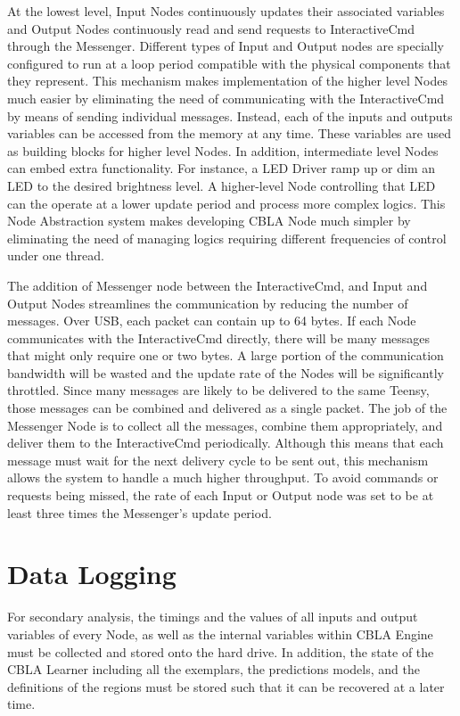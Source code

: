 At the lowest level, Input Nodes continuously updates their associated variables and Output Nodes continuously read and send requests to InteractiveCmd through the Messenger. Different types of Input and Output nodes are specially configured to run at a loop period compatible with the physical components that they represent. This mechanism makes implementation of the higher level Nodes much easier by eliminating the need of communicating with the InteractiveCmd by means of sending individual messages. Instead, each of the inputs and outputs variables can be accessed from the memory at any time. These variables are used as building blocks for higher level Nodes. In addition, intermediate level Nodes can embed extra functionality. For instance, a LED Driver ramp up or dim an LED to the desired brightness level. A higher-level Node controlling that LED can the operate at a lower update period and process more complex logics. This Node Abstraction system makes developing CBLA Node much simpler by eliminating the need of managing logics requiring different frequencies of control under one thread. 

The addition of Messenger node between the InteractiveCmd, and Input and Output Nodes streamlines the communication by reducing the number of messages. Over USB, each packet can contain up to 64 bytes. If each Node communicates with the InteractiveCmd directly, there will be many messages that might only require one or two bytes. A large portion of the communication bandwidth will be wasted and the update rate of the Nodes will be significantly throttled. Since many messages are likely to be delivered to the same Teensy, those messages can be combined and delivered as a single packet. The job of the Messenger Node is to collect all the messages, combine them appropriately, and deliver them to the InteractiveCmd periodically. Although this means that each message must wait for the next delivery cycle to be sent out, this mechanism allows the system to handle a much higher throughput. To avoid commands or requests being missed, the rate of each Input or Output node was set to be at least three times the Messenger's update period. 


\FloatBarrier
\section{Data Logging}

For secondary analysis, the timings and the values of all inputs and output variables of every Node, as well as the internal variables within CBLA Engine must be collected and stored onto the hard drive. In addition, the state of the CBLA Learner including all the exemplars, the predictions models, and the definitions of the regions must be stored such that it can be recovered at a later time. 

